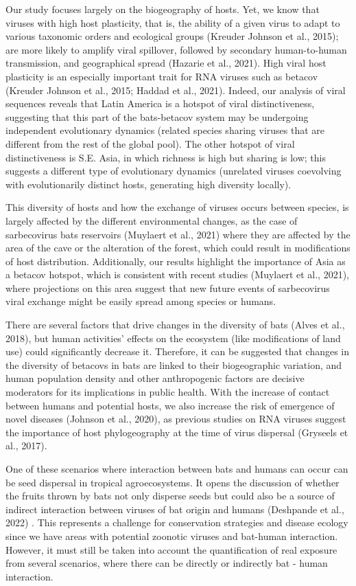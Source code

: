\documentclass[11pt]{article}
\begin{document}
Our study focuses largely on the biogeography of hosts. Yet, we know
that viruses with high host plasticity, that is, the ability of a given
virus to adapt to various taxonomic orders and ecological groups
(Kreuder Johnson et al., 2015); are more likely to amplify viral
spillover, followed by secondary human-to-human transmission, and
geographical spread (Hazarie et al., 2021). High viral host plasticity
is an especially important trait for RNA viruses such as betacov
(Kreuder Johnson et al., 2015; Haddad et al., 2021). Indeed, our
analysis of viral sequences reveals that Latin America is a hotspot of
viral distinctiveness, suggesting that this part of the bats-betacov
system may be undergoing independent evolutionary dynamics (related
species sharing viruses that are different from the rest of the global
pool). The other hotspot of viral distinctiveness is S.E. Asia, in which
richness is high but sharing is low; this suggests a different type of
evolutionary dynamics (unrelated viruses coevolving with evolutionarily
distinct hosts, generating high diversity locally).

This diversity of hosts and how the exchange of viruses occurs between
species, is largely affected by the different environmental changes, as
the case of sarbecovirus bats reservoirs (Muylaert et al., 2021) where
they are affected by the area of the cave or the alteration of the
forest, which could result in modifications of host distribution.
Additionally, our results highlight the importance of Asia as a betacov
hotspot, which is consistent with recent studies (Muylaert et al.,
2021), where projections on this area suggest that new future events of
sarbecovirus viral exchange might be easily spread among species or
humans.

There are several factors that drive changes in the diversity of bats
(Alves et al., 2018), but human activities' effects on the ecosystem
(like modifications of land use) could significantly decrease it.
Therefore, it can be suggested that changes in the diversity of betacovs
in bats are linked to their biogeographic variation, and human
population density and other anthropogenic factors are decisive
moderators for its implications in public health. With the increase of
contact between humans and potential hosts, we also increase the risk of
emergence of novel diseases (Johnson et al., 2020), as previous studies
on RNA viruses suggest the importance of host phylogeography at the time
of virus dispersal (Gryseels et al., 2017).

One of these scenarios where interaction between bats and humans can
occur can be seed dispersal in tropical agroecosystems. It opens the
discussion of whether the fruits thrown by bats not only disperse seeds
but could also be a source of indirect interaction between viruses of
bat origin and humans (Deshpande et al., 2022) . This represents a
challenge for conservation strategies and disease ecology since we have
areas with potential zoonotic viruses and bat-human interaction.
However, it must still be taken into account the quantification of real
exposure from several scenarios, where there can be directly or
indirectly bat - human interaction.
\end{document}
